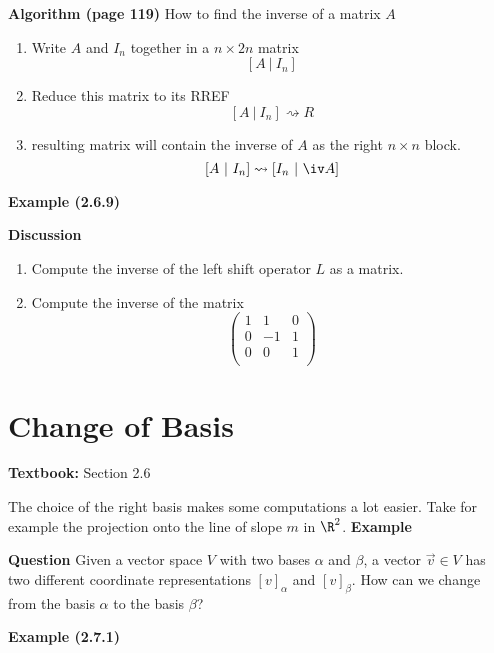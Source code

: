 \documentclass[letterpaper, 10pt]{article}
\begin{document}
\vspace{200pt}

\lb
\textbf{Algorithm (page 119)}
\lb
How to find the inverse of a matrix $A$
\begin{enumerate}
    \item Write $A$ and $I_n$ together in a $n \times 2n$ matrix
        \[ [ A ~ \vert ~ I_n ] \]
    \item
        Reduce this matrix to its RREF
        \[ [ A ~ \vert ~ I_n ]  \rightsquigarrow R \]
    \item
        resulting matrix will contain the inverse of $A$ as the right $n \times n$ block.
        \[ [ A ~ \vert ~ I_n ]  \rightsquigarrow [ I_n ~ \vert ~ \iv A ] \]
\end{enumerate}




\lb
\textbf{Example (2.6.9)}
\lb



\newpage
\lb
\textbf{Discussion}
\begin{enumerate}
    \item 
    Compute the inverse of the left shift operator $L$ as a matrix.
    \item 
Compute the inverse of the matrix
\[ \begin{pmatrix}
    1 & 1 & 0 \\
    0 & -1 & 1 \\
    0 & 0 & 1 \\
\end{pmatrix}
\]
\end{enumerate}





\newpage
\section*{Change of Basis}%
\textbf{Textbook:} Section 2.6



\lb
The choice of the right basis makes some computations a lot easier. Take for example
the projection onto the line of slope $m$ in $\R^2$.
\lb
\textbf{Example}
\lb


\vspace{300pt}
\lb
\textbf{Question}
\lb
Given a vector space $V$ with two bases $α$ and $β$, a vector $\vec v ∈ V$ has two different
coordinate representations $[v]_α$ and $[v]_β$.
\lb
How can we change from the basis $α$ to the basis $β$?

\lb
\textbf{Example (2.7.1)}
\lb
\end{document}
